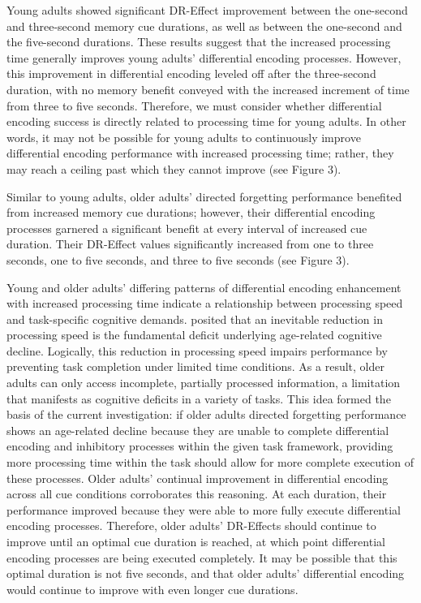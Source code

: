 \documentclass[man]{apa6}
\begin{document}
Young adults showed significant DR-Effect improvement between the one-second and three-second memory cue durations, as well as between the one-second and the five-second durations. These results suggest that the increased processing time generally improves young adults’ differential encoding processes. However, this improvement in differential encoding leveled off after the three-second duration, with no memory benefit conveyed with the increased increment of time from three to five seconds. Therefore, we must consider whether differential encoding success is directly related to processing time for young adults. In other words, it may not be possible for young adults to continuously improve differential encoding performance with increased processing time; rather, they may reach a ceiling past which they cannot improve (see Figure 3).

Similar to young adults, older adults’ directed forgetting performance benefited from increased memory cue durations; however, their differential encoding processes garnered a significant benefit at every interval of increased cue duration. Their DR-Effect values significantly increased from one to three seconds, one to five seconds, and three to five seconds (see Figure 3).

Young and older adults’ differing patterns of differential encoding enhancement with increased processing time indicate a relationship between processing speed and task-specific cognitive demands. \textcite{salthouse1996} posited that an inevitable reduction in processing speed is the fundamental deficit underlying age-related cognitive decline. Logically, this reduction in processing speed impairs performance by preventing task completion under limited time conditions. As a result, older adults can only access incomplete, partially processed information, a limitation that manifests as cognitive deficits in a variety of tasks. This idea formed the basis of the current investigation: if older adults directed forgetting performance shows an age-related decline because they are unable to complete differential encoding and inhibitory processes within the given task framework, providing more processing time within the task should allow for more complete execution of these processes. Older adults’ continual improvement in differential encoding across all cue conditions corroborates this reasoning. At each duration, their performance improved because they were able to more fully execute differential encoding processes. Therefore, older adults’ DR-Effects should continue to improve until an optimal cue duration is reached, at which point differential encoding processes are being executed completely. It may be possible that this optimal duration is not five seconds, and that older adults’ differential encoding would continue to improve with even longer cue durations.
\end{document}

